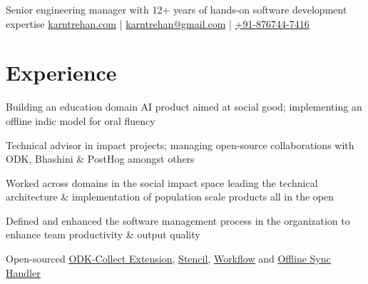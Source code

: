 \documentclass[]{deedy-resume-reversed}
\begin{document}
%
%

%
%
{Senior engineering manager with 12+ years of hands-on software development expertise}
{\href{https://karntrehan.com}{karntrehan.com} | 
\href{mailto:karntrehan@gmail.com}{karntrehan@gmail.com} | \href{tel:+918767447416}{+91-876744-7416}
}

%
%

\begin{minipage}[t]{0.60\textwidth}


\section{Experience}
\vspace{\topsep} %


\textbullet{}
\vspace{\topsep} %
\begin{tightemize}
\item Building an education domain AI product aimed at social good; implementing an offline indic model for oral fluency
\item Technical advisor in impact projects; managing open-source collaborations with ODK, Bhashini \& PostHog amongst others
\end{tightemize}

\textbullet{}
\begin{tightemize}
\item Worked across domains in the social impact space leading the technical architecture \& implementation of population scale products all in the open
\item Defined and enhanced the software management process in the organization to enhance team productivity \& output quality
\item Open-sourced {\href{https://github.com/Samagra-Development/odk-collect-extension}{\underline{ODK-Collect Extension}}}, {\href{https://github.com/SamagraX-Stencil}{\underline{Stencil}}}, {\href{https://github.com/Samagra-Development/workflow}{\underline{Workflow}}} and {\href{https://github.com/Samagra-Development/offline-sync-handler}{\underline{Offline Sync Handler}}}
\end{tightemize}
\sectionsep


\end{minipage}
\end{document}
